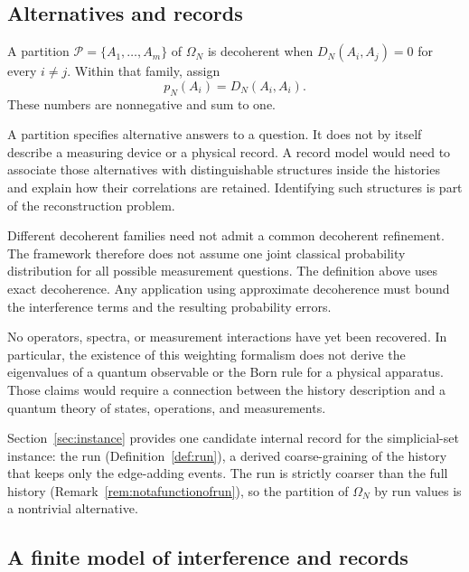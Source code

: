\subsection{Alternatives and records}
\label{sec:records}

\begin{definition}
A partition $\mathcal P=\{A_1,\ldots,A_m\}$ of $\Omega_N$ is decoherent
when $D_N(A_i,A_j)=0$ for every $i\neq j$. Within that family, assign
\[
  p_N(A_i)=D_N(A_i,A_i).
\]
These numbers are nonnegative and sum to one.
\end{definition}

A partition specifies alternative answers to a question. It does not by
itself describe a measuring device or a physical record. A record model
would need to associate those alternatives with distinguishable structures
inside the histories and explain how their correlations are retained.
Identifying such structures is part of the reconstruction problem.

Different decoherent families need not admit a common decoherent refinement.
The framework therefore does not assume one joint classical probability
distribution for all possible measurement questions. The definition above
uses exact decoherence. Any application using approximate decoherence must
bound the interference terms and the resulting probability errors.

No operators, spectra, or measurement interactions have yet been recovered.
In particular, the existence of this weighting formalism does not derive
the eigenvalues of a quantum observable or the Born rule for a physical
apparatus. Those claims would require a connection between the history
description and a quantum theory of states, operations, and measurements.

Section~\ref{sec:instance} provides one candidate internal record for the
simplicial-set instance: the run (Definition~\ref{def:run}), a derived
coarse-graining of the history that keeps only the edge-adding events.
The run is strictly coarser than the full history
(Remark~\ref{rem:notafunctionofrun}), so the partition of $\Omega_N$ by
run values is a nontrivial alternative.


\subsection{A finite model of interference and records}
\label{sec:twopath}

